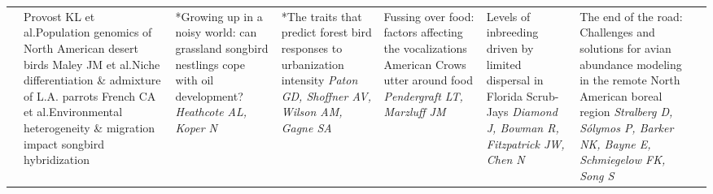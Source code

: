 \begin{tabular}{|x{0.85cm}|x{2.85cm}|x{2.85cm}|x{2.85cm}|x{2.85cm}|x{2.85cm}|a{2.85cm}|a{2.85cm}|}
&Provost KL  et al.\newline \tiny Population genomics of North American desert birds \scriptsize\newline \newline Maley JM  et al.\newline \tiny Niche differentiation \& admixture of L.A. parrots  \scriptsize\newline \newline *French CA  et al.\newline \tiny Environmental heterogeneity \& migration impact songbird hybridization \scriptsize & *Growing up in a noisy world: can grassland songbird nestlings cope with oil development? \newline \newline \textit{Heathcote AL, Koper N} & *The traits that predict forest bird responses to urbanization intensity \newline \newline \textit{Paton GD, Shoffner AV, Wilson AM, Gagne SA} & Fussing over food: factors affecting the vocalizations American Crows utter around food \newline \newline \textit{Pendergraft LT, Marzluff JM} & Levels of inbreeding driven by limited dispersal in Florida Scrub-Jays \newline \newline \textit{Diamond J, Bowman R, Fitzpatrick JW, Chen N} & The end of the road: Challenges and solutions for avian abundance modeling in the remote North American boreal region \newline \newline \textit{Stralberg D, S\'{o}lymos P, Barker NK, Bayne E, Schmiegelow FK, Song S} &  \newline \newline \textit{}\\

\end{tabular}
